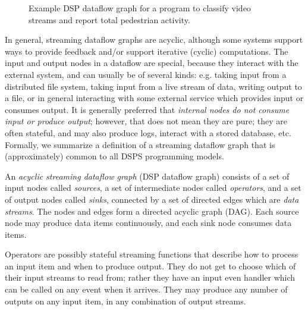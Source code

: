 \begin{figure}[t]
\centering
{}

\caption{Example DSP dataflow graph for a program to classify video streams and report total pedestrian activity.}
\label{fig:dataflow-example}
\end{figure}

In general, streaming dataflow graphs are acyclic, although some systems support ways to provide feedback and/or support iterative (cyclic) computations.
The input and output nodes in a dataflow are special, because they interact with the external system, and can usually be of several kinds: e.g. taking input from a distributed file system, taking input from a live stream of data, writing output to a file, or in general interacting with some external service which provides input or consumes output.
It is generally preferred that \emph{internal nodes do not consume input or produce output}; however, that does not mean they are pure; they are often stateful, and may also produce logs, interact with a stored database, etc.
Formally, we summarize a definition of a streaming dataflow graph that is (approximately) common to all DSPS programming models.

\begin{definition}
\label{def:dataflow-graph}
An \emph{acyclic streaming dataflow graph} (DSP dataflow graph) consists of a set of input nodes called \emph{sources}, a set of intermediate nodes
called \emph{operators}, and a set of output nodes called \emph{sinks}, connected by a set of
directed edges which are \emph{data streams}.
The nodes and edges form a directed acyclic graph (DAG).
Each source node may produce data items continuously, and each sink node consumes data items.

Operators are possibly stateful streaming functions that describe how to process an input item and when to produce output. They do not get to choose which of their input streams to read from; rather they have an input even handler which can be called on any event when it arrives.
They may produce any number of outputs on any input item, in any combination of output streams.
\end{definition}

